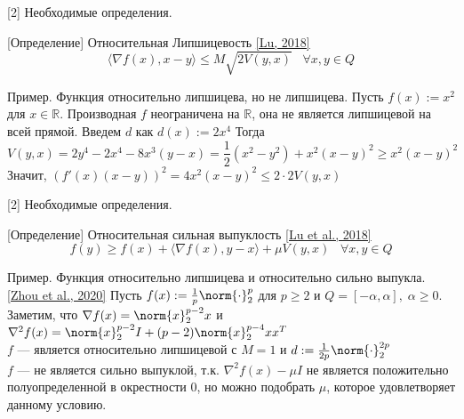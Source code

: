 \begin{frame}{[2] Необходимые определения.}
    \begin{block}{[Определение] Относительная Липшицевость  \href{https://arxiv.org/pdf/1710.04718.pdf}{[Lu, 2018]}}
        $$
        \langle \nabla f(x), x - y \rangle \leq M\sqrt{2 V(y, x)} \;\;\; \forall x, y \in Q
        $$
    \end{block}

    \begin{exampleblock}{Пример. Функция относительно липшицева, но не липшицева.} 
        Пусть $f(x) := x^2$ для $x \in \mathbb{R}$. Производная $f$ неограничена на $\mathbb{R}$, она не является липшицевой на всей прямой. Введем $d$ как $d(x) := 2x^4$
        Тогда
        $$ V(y, x) = 2y^4 - 2x^4 - 8x^3 (y-x) = \frac{1}{2}(x^2 - y^2) + x^2 (x - y)^2 \geq x^2 (x - y)^2 $$
        Значит, $ (f'(x) (x - y))^2 = 4x^2 (x - y)^2 \leq 2 \cdot 2 V(y,x)$ \\
        \vspace{\baselineskip}
    \end{exampleblock}
\end{frame}


\begin{frame}{[2] Необходимые определения.}
    \begin{block}{[Определение] Относительная сильная выпуклость \href{https://arxiv.org/pdf/1610.05708.pdf}{[Lu et al., 2018]}}
        $$
         f(y) \geq f(x) + \langle \nabla f(x), y - x \rangle + \mu V(y, x) \;\;\; \forall x, y \in Q
        $$
    \end{block}
    \begin{exampleblock}{Пример. Функция относительно липшицева и относительно сильно выпукла. \href{https://proceedings.neurips.cc/paper/2020/file/b67fb3360ae5597d85a005153451dd4e-Paper.pdf}{[Zhou et al., 2020]}} 
        Пусть $f(x) := \frac{1}{p}\norm{\cdot}^p_2$ для $p \geq 2$ и $ Q = [-\alpha, \alpha], \; \alpha \ge 0$. Заметим, что $\nabla f(x) = \norm{x}_2^{p - 2} x$ и $\nabla^2 f(x) = \norm{x}_2^{p - 2} I + (p-2)\norm{x}_2^{p - 4} x x^{T}$\\
        $f$ --- является относительно липшицевой с $M = 1$ и $d := \frac{1}{2p}\norm{\cdot}_2^{2p}$\\
        $f$ --- не является сильно выпуклой, т.к. $\nabla^2 f(x) - \mu I$ не является положительно полуопределенной в окрестности 0, но можно подобрать $\mu$, которое удовлетворяет данному условию.
    \end{exampleblock}
\end{frame}


